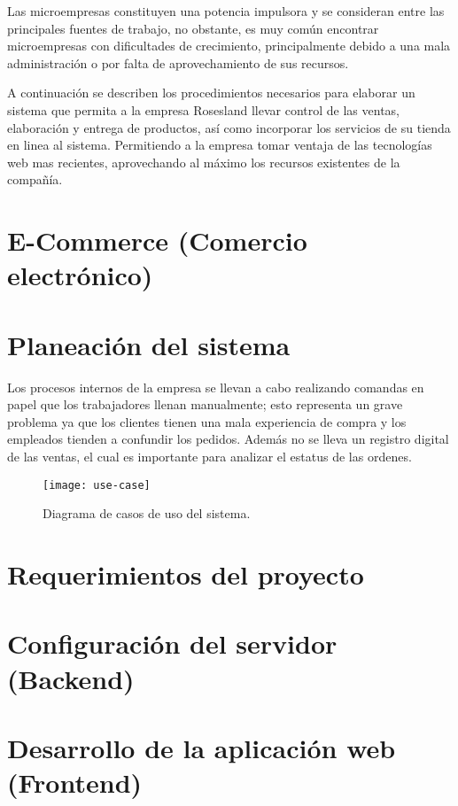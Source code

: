 Las microempresas constituyen una potencia impulsora y se consideran entre las principales fuentes de trabajo, no obstante, es muy común encontrar microempresas con dificultades de crecimiento, principalmente debido a una mala administración o por falta de aprovechamiento de sus recursos.
\vspace{0.8cm}

A continuación se describen los procedimientos necesarios para elaborar un sistema que permita a la empresa Rosesland llevar control de las ventas, elaboración y entrega de productos, así como incorporar los servicios de su tienda en linea al sistema. Permitiendo a la empresa tomar ventaja de las tecnologías web mas recientes, aprovechando al máximo los recursos existentes de la compañía.

\section{E-Commerce (Comercio electrónico)}


\newpage
\section{Planeación del sistema}
Los procesos internos de la empresa se llevan a cabo realizando comandas en papel que los trabajadores llenan manualmente; esto representa un grave problema ya que los clientes tienen una mala experiencia de compra y los empleados tienden a confundir los pedidos. Además no se lleva un registro digital de las ventas, el cual es importante para analizar el estatus de las ordenes. 
\vspace{0.8cm}

\begin{figure}[H]
  \centering
  \texttt{[image: use-case]}
  \caption{Diagrama de casos de uso del sistema.}
\end{figure}
\vspace{0.8cm}

\section{Requerimientos del proyecto}


\newpage
\section{Configuración del servidor (Backend)}


\newpage
\section{Desarrollo de la aplicación web (Frontend)}

